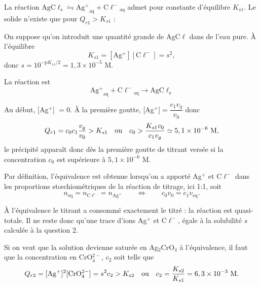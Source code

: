 \begin{solution}
\begin{questions}
    \questioncours La réaction $\mathrm{AgC\ell_\text{s} \leftrightharpoons {Ag^+}_\text{aq} + {C\ell^-}_\text{aq}}$ admet pour constante d'équilibre $K_{s1}$. Le solide n'existe que pour $Q_{r1} > K_{s1}$ :
    \begin{center}\end{center}
    
    \question On suppose qu'on introduit une quantité grande de AgC$\ell$ dans de l'eau pure. \`A l'équilibre
    $$K_{s1} = \mathrm{[Ag^+][C\ell^-]} = s^2,$$
    donc $s = 10^{-\text{p}K_{s1}/2} = 1,3 \times 10^{-5}$ M.
    
    \question La réaction est
    $$\mathrm{{Ag^+}_\text{aq} + {C\ell^-}_\text{aq} \longrightarrow AgC\ell_\text{s}}$$
    
    \question Au début, [Ag$^+$] $= 0$.
    \`A la première goutte, [Ag$^+$]$ = \dfrac{c_1 v_g}{v_0}$ donc
    $$Q_{r1} = c_0 c_1 \dfrac{v_g}{v_0} > K_{s1} \qqtext{ou} c_0 > \dfrac{K_{s1} v_0}{c_1 v_g} \simeq 5,1 \times 10^{-6} \text{ M},$$
    le précipité apparaît donc dès la première goutte de titrant versée si la concentration $c_0$ est supérieure à $5,1 \times 10^{-6}$ M.
    
    \question Par définition, l’équivalence est obtenue lorsqu’on a apporté Ag$^+$ et C$\ell^-$ dans les proportions st{\oe}chiométriques de la réaction de titrage, ici 1:1, soit
    $$n_\text{eq} = n_\mathrm{C\ell^-} = n_\mathrm{Ag^+} \qquad \Longleftrightarrow \qquad c_0 v_0 = c_1 v_\text{eq}.$$
    
    \question \`A l’équivalence le titrant a consommé exactement le titré : la réaction est quasi-totale. Il ne reste donc qu'une trace d'ions Ag$^+$ et C$\ell^-$, égale à la solubilité $s$ calculée à la question 2.
    
    Si on veut que la solution devienne saturée en Ag$_2$CrO$_4$ à l'équivalence, il faut que la concentration en CrO$_4^{2-}$, $c_2$ soit telle que 
    $$Q_{r2} = \mathrm{[Ag^+]^2 [CrO_4^{2-}]} = s^2 c_2 > K_{s2} \qqtext{ou} c_2 = \dfrac{K_{s2}}{K_{s1}} = 6,3 \times 10^{-3} \text{ M}.$$
    

\end{questions}
\end{solution}
